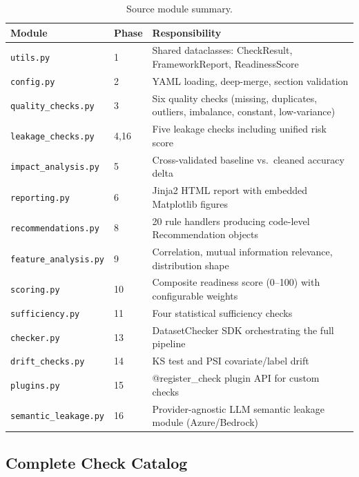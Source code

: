 \documentclass[12pt,a4paper]{report}
\newcommand{\tblhead}{\rowcolor{tblHeadBg}\color{white}\bfseries}
\begin{document}
\begin{table}[!ht]
\centering
\caption{Source module summary.}
\label{tab:modules}
\scriptsize
{}
\begin{tabularx}{\textwidth}{llX}
\toprule
\tblhead \textbf{Module} & \textbf{Phase} & \textbf{Responsibility} \\
\midrule
\texttt{utils.py}        & 1  & Shared dataclasses: CheckResult, FrameworkReport, ReadinessScore \\
\texttt{config.py}       & 2  & YAML loading, deep-merge, section validation \\
\texttt{quality\_checks.py} & 3 & Six quality checks (missing, duplicates, outliers, imbalance, constant, low-variance) \\
\texttt{leakage\_checks.py} & 4,16 & Five leakage checks including unified risk score \\
\texttt{impact\_analysis.py} & 5 & Cross-validated baseline vs.\ cleaned accuracy delta \\
\texttt{reporting.py}    & 6  & Jinja2 HTML report with embedded Matplotlib figures \\
\texttt{recommendations.py} & 8 & 20 rule handlers producing code-level Recommendation objects \\
\texttt{feature\_analysis.py} & 9 & Correlation, mutual information relevance, distribution shape \\
\texttt{scoring.py}      & 10 & Composite readiness score (0--100) with configurable weights \\
\texttt{sufficiency.py}  & 11 & Four statistical sufficiency checks \\
\texttt{checker.py}      & 13 & DatasetChecker SDK orchestrating the full pipeline \\
\texttt{drift\_checks.py} & 14 & KS test and PSI covariate/label drift \\
\texttt{plugins.py}      & 15 & @register\_check plugin API for custom checks \\
\texttt{semantic\_leakage.py} & 16 & Provider-agnostic LLM semantic leakage module (Azure/Bedrock) \\
\bottomrule
\end{tabularx}
\end{table}

\subsection{Complete Check Catalog}
\end{document}
